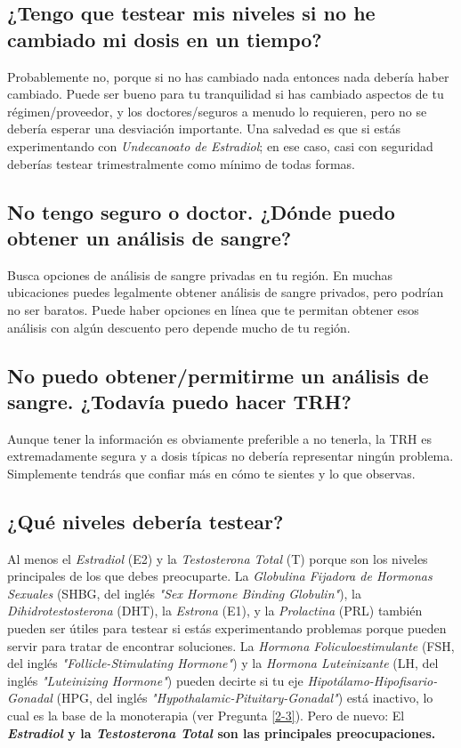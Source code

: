 \documentclass{article}
\begin{document}
\subsection{¿Tengo que testear mis niveles si no he cambiado mi dosis en un tiempo?}

Probablemente no, porque si no has cambiado nada entonces nada debería haber cambiado. Puede ser bueno para tu tranquilidad si has cambiado aspectos de tu régimen/proveedor, y los doctores/seguros a menudo lo requieren, pero no se debería esperar una desviación importante. Una salvedad es que si estás experimentando con \textit{Undecanoato de Estradiol}; en ese caso, casi con seguridad deberías testear trimestralmente como mínimo de todas formas.

\subsection{No tengo seguro o doctor. ¿Dónde puedo obtener un análisis de sangre?}

Busca opciones de análisis de sangre privadas en tu región. En muchas ubicaciones puedes legalmente obtener análisis de sangre privados, pero podrían no ser baratos. Puede haber opciones en línea que te permitan obtener esos análisis con algún descuento pero depende mucho de tu región.

\subsection{No puedo obtener/permitirme un análisis de sangre. ¿Todavía puedo hacer TRH?}

Aunque tener la información es obviamente preferible a no tenerla, la TRH es extremadamente segura y a dosis típicas no debería representar ningún problema. Simplemente tendrás que confiar más en cómo te sientes y lo que observas.

\subsection{¿Qué niveles debería testear?}

Al menos el \textit{Estradiol} (E2) y la \textit{Testosterona Total} (T) porque son los niveles principales de los que debes preocuparte. La \textit{Globulina Fijadora de Hormonas Sexuales} (SHBG, del inglés \textit{"Sex Hormone Binding Globulin"}), la \textit{Dihidrotestosterona} (DHT), la \textit{Estrona} (E1), y la \textit{Prolactina} (PRL) también pueden ser útiles para testear si estás experimentando problemas porque pueden servir para tratar de encontrar soluciones. La \textit{Hormona Foliculoestimulante} (FSH, del inglés \textit{"Follicle-Stimulating Hormone"}) y la \textit{Hormona Luteinizante} (LH, del inglés \textit{"Luteinizing Hormone"}) pueden decirte si tu eje \textit{Hipotálamo-Hipofisario-Gonadal} (HPG, del inglés \textit{"Hypothalamic-Pituitary-Gonadal"}) está inactivo, lo cual es la base de la monoterapia (ver Pregunta \ref{2-3}). Pero de nuevo: El \textbf{\textit{Estradiol} y la \textit{Testosterona Total} son las principales preocupaciones.}
\end{document}
